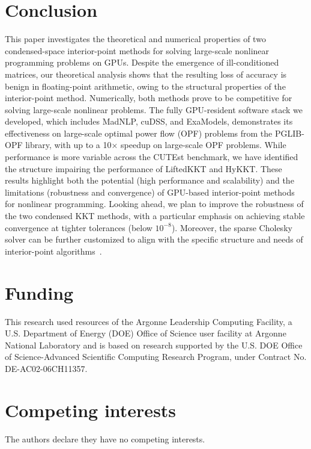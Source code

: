 \documentclass[smallextended]{svjour3}
\begin{document}
\section{Conclusion}
This paper investigates the theoretical and numerical properties of two condensed-space interior-point methods for solving large-scale nonlinear programming problems on GPUs.
Despite the emergence of ill-conditioned matrices, our theoretical analysis shows that the resulting loss of accuracy is benign in floating-point arithmetic, owing to the structural properties of the interior-point method.
Numerically, both methods prove to be competitive for solving large-scale nonlinear problems.
The fully GPU-resident software stack we developed, which includes MadNLP, cuDSS, and ExaModels, demonstrates its effectiveness on large-scale optimal power flow (OPF) problems from the PGLIB-OPF library,
with up to a 10× speedup on large-scale OPF problems.
While performance is more variable across the CUTEst benchmark, we have identified the structure impairing the performance of LiftedKKT and HyKKT.
These results highlight both the potential (high performance and scalability) and the limitations (robustness and convergence) of GPU-based interior-point methods for nonlinear programming.
Looking ahead, we plan to improve the robustness of the two condensed KKT methods, with a particular emphasis on achieving stable convergence at tighter tolerances (below $10^{-8}$).
Moreover, the sparse Cholesky solver can be further customized to align with the specific structure and needs of interior-point algorithms~\cite{wright1999modified}.

\section*{Funding}
This research used resources of the Argonne Leadership Computing Facility, a U.S. Department of Energy (DOE) Office of Science user facility at Argonne National Laboratory and is based on research supported by the U.S. DOE Office of Science-Advanced Scientific Computing Research Program, under Contract No. DE-AC02-06CH11357.

\section*{Competing interests}
The authors declare they have no competing interests.


\small



\end{document}
